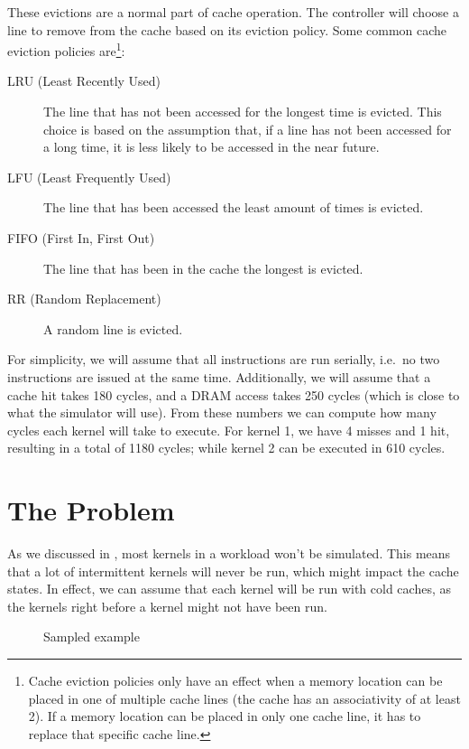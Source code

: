 These evictions are a normal part of cache operation.
The controller will choose a line to remove from the cache based on its eviction policy.
Some common cache eviction policies are\footnote{Cache eviction policies only have an effect when a memory location can be placed in one of multiple cache lines (the cache has an associativity of at least 2). If a memory location can be placed in only one cache line, it has to replace that specific cache line.}:
\begin{description}
    \item[LRU (Least Recently Used)] The line that has not been accessed for the longest time is evicted.
    This choice is based on the assumption that, if a line has not been accessed for a long time, it is less likely to be accessed in the near future.
    \item[LFU (Least Frequently Used)] The line that has been accessed the least amount of times is evicted.
    \item[FIFO (First In, First Out)] The line that has been in the cache the longest is evicted.
    \item[RR (Random Replacement)] A random line is evicted.
\end{description}

For simplicity, we will assume that all instructions are run serially, i.e.\ no two instructions are issued at the same time.
Additionally, we will assume that a cache hit takes 180 cycles, and a DRAM access takes 250 cycles (which is close to what the simulator will use).
From these numbers we can compute how many cycles each kernel will take to execute.
For kernel 1, we have 4 misses and 1 hit, resulting in a total of 1180 cycles; while kernel 2 can be executed in 610 cycles.

\section{The Problem}\label{sec:the-problem}
As we discussed in , most kernels in a workload won't be simulated.
This means that a lot of intermittent kernels will never be run, which might impact the cache states.
In effect, we can assume that each kernel will be run with cold caches, as the kernels right before a kernel might not have been run.

\begin{figure}[hbt]
    \centering
    \caption{Sampled example}
    \label{fig:flush-exec}
\end{figure}

